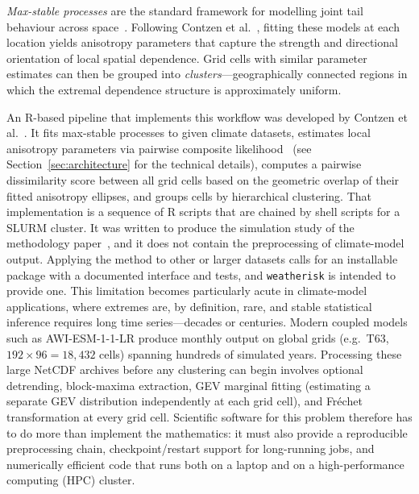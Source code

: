 \documentclass[preprint,12pt,a4paper]{elsarticle}
\newcommand{\rev}[1]{{#1}}
\newcommand{\revr}[1]{{#1}}
\newcommand{\revt}[1]{{#1}}
\begin{document}
\emph{Max-stable processes} are the standard framework for
modelling joint tail behaviour across space~\cite{dehaan2006,padoan2010}.
Following Contzen et al.~\cite{contzen2025}, fitting these models at each location
yields anisotropy parameters that capture the strength and
directional orientation of local spatial dependence.
Grid cells with similar parameter estimates can then be grouped
into \emph{clusters}---geographically connected regions in which
the extremal dependence structure is approximately uniform.

An R-based pipeline that implements this workflow was developed
by Contzen et al.~\cite{contzen2025}. It \revt{fits max-stable processes to given
climate datasets},
estimates local anisotropy parameters via pairwise composite
likelihood~\cite{padoan2010} \revr{(see Section~\ref{sec:architecture} for the
technical details)}, computes a pairwise dissimilarity score between
all grid cells based on the geometric overlap of their fitted
anisotropy ellipses, and \revt{groups} cells by hierarchical clustering. \revt{That
implementation} is a sequence of R scripts that are chained by shell
scripts for a SLURM cluster\revt{. It was written to produce the
simulation study of the methodology paper~\cite{contzen2025}, and it
does not contain the preprocessing of climate-model output. Applying
the method to other or larger datasets calls for an installable
package with a documented interface and tests, and
\texttt{weatherisk} is intended to provide one.}
\rev{This limitation becomes particularly acute in climate-model
applications, where extremes are, by definition, rare, and stable
statistical inference requires long time series---decades or
centuries. Modern coupled models such as AWI-ESM-1-1-LR produce
monthly output on global grids (e.g.\ T63, $192 \times 96 = 18{,}432$ cells) spanning hundreds of simulated years.  Processing
these large NetCDF archives before any clustering can begin involves
optional detrending, block-maxima extraction, GEV marginal fitting (estimating
a separate GEV distribution independently at each grid cell), and
Fr\'{e}chet transformation at every grid cell.  Scientific software
for this problem therefore has to do more than implement the
mathematics: it must also provide a reproducible preprocessing chain,
checkpoint/restart support for long-running jobs, and numerically
efficient code that runs both on a laptop and on a
high-performance computing (HPC) cluster.}
\end{document}
